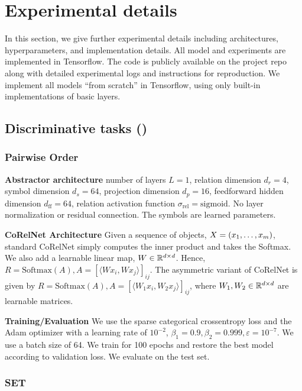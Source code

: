 \section{Experimental details}\label{sec:experimental_details}

In this section, we give further experimental details including architectures, hyperparameters, and implementation details. All model and experiments are implemented in Tensorflow. The code is publicly available on the project repo along with detailed experimental logs and instructions for reproduction. We implement all models ``from scratch'' in Tensorflow, using only built-in implementations of basic layers.

\subsection{Discriminative tasks ()}

\subsubsection{Pairwise Order}
\textbf{Abstractor architecture} number of layers $L = 1$, relation dimension $d_r = 4$, symbol dimension $d_s = 64$, projection dimension $d_p = 16$, feedforward hidden dimension $d_{\mathrm{ff}} = 64$, relation activation function $\sigma_{\mathrm{rel}} = \mathrm{sigmoid}$. No layer normalization or residual connection. The symbols are learned parameters.

\textbf{CoRelNet Architecture} Given a sequence of objects, $X = (x_1, \ldots, x_m)$, standard CoRelNet simply computes the inner product and takes the Softmax. We also add a learnable linear map, $W \in \mathbb{R}^{d \times d}$. Hence, $R = \text{Softmax}(A), A = {\left[\langle W x_i, W x_j\rangle\right]}_{ij}$. The asymmetric variant of CoRelNet is given by $R = \text{Softmax}(A), A = {\left[\langle W_1 x_i, W_2 x_j\rangle\right]}_{ij}$, where $W_1, W_2 \in \mathbb{R}^{d \times d}$ are learnable matrices.

\textbf{Training/Evaluation} We use the sparse categorical crossentropy loss and the Adam optimizer with a learning rate of $10^{-2}$, $\beta_1 = 0.9, \beta_2 = 0.999, \varepsilon = 10^{-7}$. We use a batch size of 64. We train for 100 epochs and restore the best model according to validation loss. We evaluate on the test set.

\subsubsection{SET}

